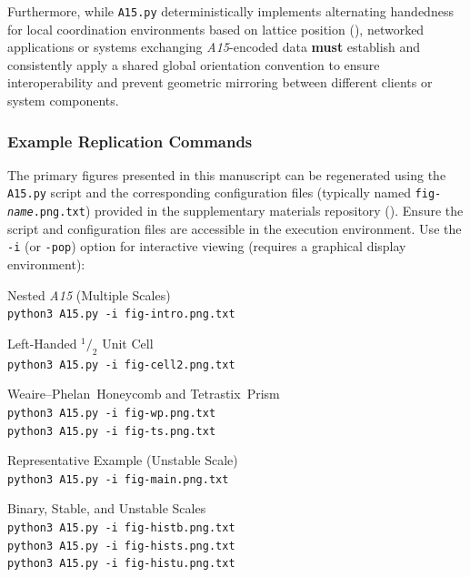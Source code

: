 \documentclass[10pt]{article}
\def\AAAB{\textit{A15}}
\def\WP{Weaire--Phelan}
\def\WPH{\WP{}~Honeycomb}
\def\TSP{Tetrastix~Prism}
\begin{document}
Furthermore, while \texttt{A15.py} deterministically implements alternating handedness for local coordination environments based on lattice position (), networked applications or systems exchanging \AAAB{}-encoded data \textbf{must} establish and consistently apply a shared global orientation convention to ensure interoperability and prevent geometric mirroring between different clients or system components.

\subsubsection{Example Replication Commands}\label{subsubsec-repl-commands}
The primary figures presented in this manuscript can be regenerated using the \texttt{A15.py} script and the corresponding configuration files (typically named \texttt{fig-\textit{name}.png.txt}) provided in the supplementary materials repository (). Ensure the script and configuration files are accessible in the execution environment. Use the \texttt{-i} (or \texttt{-pop}) option for interactive viewing (requires a graphical display environment):

\begin{description} \itemsep0pt
    \item[\Cref{fig-intro} (Intro):] Nested \AAAB{} (Multiple Scales) \\
        \texttt{python3 A15.py -i fig-intro.png.txt}
    \item[\Cref{fig-cell2} (Internals):] Left-Handed $^1/_2$ Unit Cell \\
        \texttt{python3 A15.py -i fig-cell2.png.txt}
    \item[\Cref{fig-wp-ts} (Partitions):] \WPH{} and \TSP{} \\
        \texttt{python3 A15.py -i fig-wp.png.txt} \\
        \texttt{python3 A15.py -i fig-ts.png.txt}
    \item[\Cref{fig-main} (Composite):] Representative Example (Unstable Scale) \\
        \texttt{python3 A15.py -i fig-main.png.txt}
    \item[\Cref{fig-hist} (Histograms):] Binary, Stable, and Unstable Scales \\
        \texttt{python3 A15.py -i fig-histb.png.txt} \\
        \texttt{python3 A15.py -i fig-hists.png.txt} \\
        \texttt{python3 A15.py -i fig-histu.png.txt}
\end{description}
\end{document}
